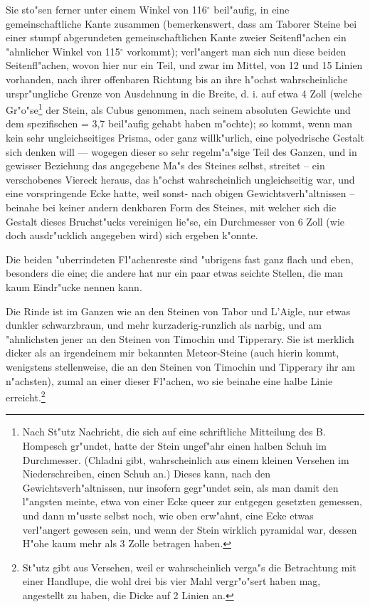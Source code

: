 \documentclass[a4paper, 11pt, oneside, german]{article}
\begin{document}
Sie sto"sen ferner unter einem Winkel von 116$^{\circ}$ beil"aufig, in eine gemeinschaftliche Kante zusammen (bemerkenswert, dass am Taborer Steine bei einer stumpf abgerundeten gemeinschaftlichen Kante zweier Seitenfl"achen ein "ahnlicher Winkel von 115$^{\circ}$ vorkommt); verl"angert man sich nun diese beiden Seitenfl"achen, wovon hier nur ein Teil, und zwar im Mittel, von 12 und 15 Linien vorhanden, nach ihrer offenbaren Richtung bis an ihre h"ochst wahrscheinliche urspr"ungliche Grenze von Ausdehnung in die Breite, d. i. auf etwa 4 Zoll (welche Gr"o"se\footnote{Nach St"utz Nachricht, die sich auf eine schriftliche Mitteilung des B. Hompesch gr"undet, hatte der Stein ungef"ahr einen halben Schuh im Durchmesser. (Chladni gibt, wahrscheinlich aus einem kleinen Versehen im Niederschreiben, einen Schuh an.) Dieses kann, nach den Gewichtsverh"altnissen, nur insofern gegr"undet sein, als man damit den l"angsten meinte, etwa von einer Ecke queer zur entgegen gesetzten gemessen, und dann m"usste selbst noch, wie oben erw"ahnt, eine Ecke etwas verl"angert gewesen sein, und wenn der Stein wirklich pyramidal war, dessen H"ohe kaum mehr als 3 Zolle betragen haben.} der Stein, als Cubus genommen, nach seinem absoluten Gewichte und dem spezifischen = 3,7 beil"aufig gehabt haben m"ochte); so kommt, wenn man kein sehr ungleichseitiges Prisma, oder ganz willk"urlich, eine polyedrische Gestalt sich denken will --- wogegen dieser so sehr regelm"a"sige Teil des Ganzen, und in gewisser Beziehung das angegebene Ma"s des Steines selbst, streitet -- ein verschobenes Viereck heraus, das h"ochst wahrscheinlich ungleichseitig war, und eine vorspringende Ecke hatte, weil sonst- nach obigen Gewichtsverh"altnissen -- beinahe bei keiner andern denkbaren Form des Steines, mit welcher sich die Gestalt dieses Bruchst"ucks vereinigen lie"se, ein Durchmesser von 6 Zoll (wie doch ausdr"ucklich angegeben wird) sich ergeben k"onnte.

Die beiden "uberrindeten Fl"achenreste sind "ubrigens fast ganz flach und eben, besonders die eine; die andere hat nur ein paar etwas seichte Stellen, die man kaum Eindr"ucke nennen kann.

Die Rinde ist im Ganzen wie an den Steinen von Tabor und L'Aigle, nur etwas dunkler schwarzbraun, und mehr kurzaderig-runzlich als narbig, und am "ahnlichsten jener an den Steinen von Timochin und Tipperary. Sie ist merklich dicker als an irgendeinem mir bekannten Meteor-Steine (auch hierin kommt, wenigstens stellenweise, die an den Steinen von Timochin und Tipperary ihr am n"achsten), zumal an einer dieser Fl"achen, wo sie beinahe eine halbe Linie erreicht.\footnote{St"utz gibt aus Versehen, weil er wahrscheinlich verga"s die Betrachtung mit einer Handlupe, die wohl drei bis vier Mahl vergr"o"sert haben mag, angestellt zu haben, die Dicke auf 2 Linien an.}
\end{document}
